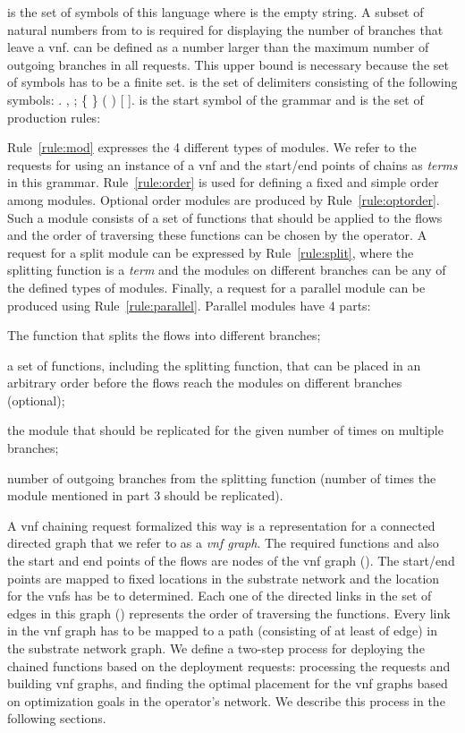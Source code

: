 \documentclass[10pt,a4paper,conference]{IEEEtran}
\begin{document}
 is the
set of symbols of this language where  is the empty string. 
A subset of natural numbers from  to  is 
required for displaying the number of branches that leave a \ac{vnf}.  can be
defined as a number larger than the maximum number of outgoing branches in all requests. 
This upper bound is necessary because the set of symbols has 
to be a finite set.  is the set of delimiters consisting of the following symbols:
. , ; \{ \} ( ) [  ].  is the start 
symbol of the grammar and  is the set of production rules:
{\footnotesize
  
  }
Rule~\ref{rule:mod} expresses the 4 different types of modules. We refer to the 
requests for using an instance of a \ac{vnf} and the start/end points of chains as 
\emph{terms} in this grammar. Rule~\ref{rule:order} is used for defining a fixed 
and simple order among modules. Optional order modules are produced by 
Rule~\ref{rule:optorder}. Such a module consists of a set of functions that
should be applied to the flows and the order of traversing these functions can be
chosen by the operator. A request for a split module can be expressed by 
Rule~\ref{rule:split}, where the splitting function is a \emph{term} and the modules
on different branches can be any of the defined types of modules. Finally, a request 
for a parallel module can be produced using Rule~\ref{rule:parallel}. Parallel 
modules have 4 parts:
\begin{inparaenum}
 \item The function that splits the flows into different branches; 
 \item a set of functions, including the splitting function, that can be placed 
 in an arbitrary order before the flows reach the modules on different branches 
 (optional);
 \item the module that should be replicated for the given number of times on
 multiple branches;
 \item number of outgoing branches from the splitting function (number of times 
 the module mentioned in part 3 should be replicated).
\end{inparaenum}

A \ac{vnf} chaining request formalized this way is a representation
for a connected directed graph that we refer to as a \emph{\ac{vnf} graph}. The required 
functions and also the start and end points of the flows are nodes of the \ac{vnf} 
graph (). The start/end points are mapped to fixed locations in the substrate
network and the location for the \acp{vnf} has be to determined. Each one of the 
directed links in the set of edges in this graph () represents 
the order of traversing the functions. Every link in the \ac{vnf} graph has to be 
mapped to a path (consisting of at least of edge) in the 
substrate network graph. We define a two-step process for deploying the chained 
functions based on the deployment requests: processing the requests and building 
\ac{vnf} graphs, and finding the optimal placement for the \ac{vnf} graphs based 
on optimization goals in the operator's network. We describe this process in the following
sections.
\end{document}

